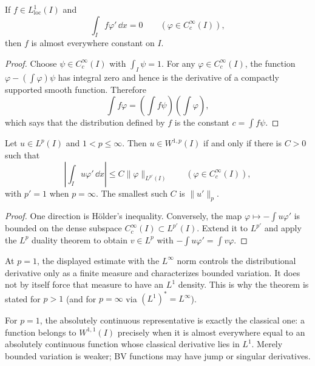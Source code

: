 \begin{notelemma}
If $f\in L^1_{\mathrm{loc}}(I)$ and
\[
  \int_I f\varphi'\,\dd x=0
  \qquad(\varphi\in C_c^\infty(I)),
\]
then $f$ is almost everywhere constant on $I$.
\end{notelemma}

\begin{proof}
Choose $\psi\in C_c^\infty(I)$ with $\int_I\psi=1$.  For any
$\varphi\in C_c^\infty(I)$, the function
$\varphi-(\int\varphi)\psi$ has integral zero and hence is the derivative of
a compactly supported smooth function.  Therefore
\[
  \int f\varphi
  =\left(\int f\psi\right)\left(\int\varphi\right),
\]
which says that the distribution defined by $f$ is the constant
$c=\int f\psi$.
\end{proof}

\begin{noteproposition}
Let $u\in L^p(I)$ and $1<p\le\infty$.  Then $u\in W^{1,p}(I)$ if and only
if there is $C>0$ such that
\[
  \left|\int_Iu\varphi'\,\dd x\right|
  \le C\|\varphi\|_{L^{p'}(I)}
  \qquad(\varphi\in C_c^\infty(I)),
\]
with $p'=1$ when $p=\infty$.  The smallest such $C$ is
$\|u'\|_p$.
\end{noteproposition}

\begin{proof}
One direction is Hölder's inequality.  Conversely, the map
$\varphi\mapsto-\int u\varphi'$ is bounded on the dense subspace
$C_c^\infty(I)\subset L^{p'}(I)$.  Extend it to $L^{p'}$ and apply the
$L^p$ duality theorem to obtain $v\in L^p$ with
$-\int u\varphi'=\int v\varphi$.
\end{proof}

\begin{noteremark}
At $p=1$, the displayed estimate with the $L^\infty$ norm controls the
distributional derivative only as a finite measure and characterizes bounded
variation.  It does not by itself force that measure to have an $L^1$
density.  This is why the theorem is stated for $p>1$ (and for $p=\infty$ via
$(L^1)^*=L^\infty$).
\end{noteremark}

\begin{noteremark}
For $p=1$, the absolutely continuous representative is exactly the classical
one: a function belongs to $W^{1,1}(I)$ precisely when it is almost everywhere
equal to an absolutely continuous function whose classical derivative lies in
$L^1$.  Merely bounded variation is weaker; BV functions may have jump or
singular derivatives.
\end{noteremark}

